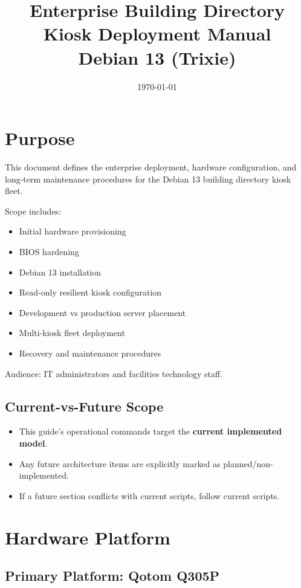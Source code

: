 \documentclass[11pt,letterpaper]{article}
\title{Enterprise Building Directory Kiosk Deployment Manual\\Debian 13 (Trixie)}
\author{}
\date{\today}
\begin{document}
\maketitle

\section{Purpose}

This document defines the enterprise deployment, hardware configuration, and long-term maintenance procedures for the Debian 13 building directory kiosk fleet.

Scope includes:

\begin{itemize}
\item Initial hardware provisioning
\item BIOS hardening
\item Debian 13 installation
\item Read-only resilient kiosk configuration
\item Development vs production server placement
\item Multi-kiosk fleet deployment
\item Recovery and maintenance procedures
\end{itemize}

Audience: IT administrators and facilities technology staff.

\subsection{Current-vs-Future Scope}

\begin{itemize}
\item This guide's operational commands target the \textbf{current implemented model}.
\item Any future architecture items are explicitly marked as planned/non-implemented.
\item If a future section conflicts with current scripts, follow current scripts.
\end{itemize}

\section{Hardware Platform}

\subsection{Primary Platform: Qotom Q305P}
\end{document}

